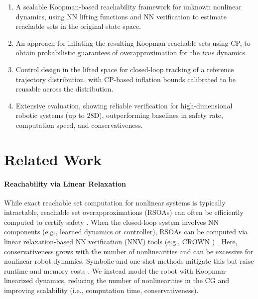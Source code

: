\documentclass{l4dc2026}
\begin{document}
\begin{enumerate}
  \setlength{\itemsep}{0pt}
  \setlength{\parskip}{0pt}
  \setlength{\parsep}{0pt}
  \setlength{\topsep}{0pt}
  \setlength{\partopsep}{0pt}
  \item A scalable Koopman-based reachability framework for unknown nonlinear dynamics, using NN lifting functions and NN verification to estimate reachable sets in the original state space.
  \item An approach for inflating the resulting Koopman reachable sets using CP, to obtain probabilistic guarantees of overapproximation for the \textit{true} dynamics.
  \item Control design in the lifted space for closed-loop tracking of a reference trajectory distribution, with CP-based inflation bounds calibrated to be reusable across the distribution.
  \item Extensive evaluation, showing reliable verification for high-dimensional robotic systems (up to 28D), outperforming baselines in safety rate, computation speed, and conservativeness.
\end{enumerate}

\section{Related Work}
\label{related_work}

\paragraph{Reachability via Linear Relaxation}
While exact reachable set computation for nonlinear systems is typically intractable, reachable set overapproximations (RSOAs) can often be efficiently computed to certify safety \citep{DBLP:journals/arcras/AlthoffFG21}. When the closed-loop system involves NN components (e.g., learned dynamics or controller), RSOAs can be computed via linear relaxation-based NN verification (NNV) tools (e.g., CROWN \citep{Zhang2018CROWN}) \citep{Zhang2018CROWN, Everett2021NFL, Jafarpour2024AkashNFL}. Here, conservativeness grows with the number of nonlinearities \citep{sage-mp} and can be excessive for nonlinear robot dynamics. Symbolic and one-shot methods mitigate this but raise runtime and memory costs \citep{Chen2023One-Shot, Rober2024CARV, Everett2021NFL}. We instead model the robot with Koopman-linearized dynamics, reducing the number of nonlinearities in the CG and improving scalability (i.e., computation time, conservativeness).
\end{document}
